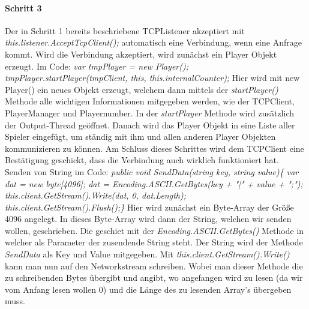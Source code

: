 \paragraph{Schritt 3}
Der in Schritt 1 bereits beschriebene TCPListener akzeptiert mit \textit{this.listener.AcceptTcpClient();} automatisch eine Verbindung, wenn eine Anfrage kommt.
Wird die Verbindung akzeptiert, wird zunächst ein Player Objekt erzeugt. Im Code: 
\newline 
\textit{var tmpPlayer = new Player(); \newline
tmpPlayer.startPlayer(tmpClient, this, this.internalCounter);}
\newline
Hier wird mit new Player() ein neues Objekt erzeugt, welchem dann mittels der \textit{startPlayer()} Methode alle wichtigen Informationen mitgegeben werden, wie der TCPClient, PlayerManager und Playernumber. In der \textit{startPlayer} Methode wird zusätzlich der Output-Thread geöffnet.
Danach wird das Player Objekt in eine Liste aller Spieler eingefügt, um ständig mit ihm und allen anderen Player Objekten kommunizieren zu können. Am Schluss dieses Schrittes wird dem TCPClient eine Bestätigung geschickt, dass die Verbindung auch wirklich funktioniert hat. Senden von String im Code:
\newline
\textit{
public void SendData(string key, string value)\{\newline
var dat = new byte[4096];\newline
dat = Encoding.ASCII.GetBytes(key + "|" + value + ";");\newline
this.client.GetStream().Write(dat, 0, dat.Length);\newline
this.client.GetStream().Flush();\newline \}
} \newline
Hier wird zunächst ein Byte-Array der Größe 4096 angelegt. In dieses Byte-Array wird dann der String, welchen wir senden wollen, geschrieben. 
Die geschiet mit der \textit{Encoding.ASCII.GetBytes()} Methode in welcher als Parameter der zusendende String steht. 
Der String wird der Methode \textit{SendData} als Key und Value mitgegeben. Mit \textit{this.client.GetStream().Write()} kann man nun auf den Networkstream schreiben.
Wobei man dieser Methode die zu schreibenden Bytes übergibt und angibt, wo angefangen wird zu lesen (da wir vom Anfang lesen wollen 0) und die Länge des zu lesenden Array's übergeben muss.

